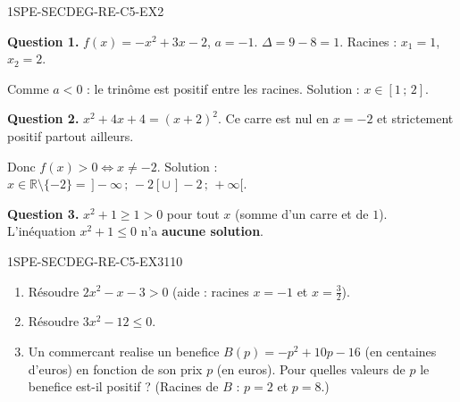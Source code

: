 \begin{corrige}{1SPE-SECDEG-RE-C5-EX2}

\textbf{Question 1.} $f(x) = -x^2 + 3x - 2$, $a = -1$. $\Delta = 9 - 8 = 1$. Racines : $x_1 = 1$, $x_2 = 2$.

Comme $a < 0$ : le trinôme est positif entre les racines. Solution : $x \in [1\,;\,2]$.


\textbf{Question 2.} $x^2 + 4x + 4 = (x+2)^2$. Ce carre est nul en $x = -2$ et strictement positif partout ailleurs.

Donc $f(x) > 0 \Leftrightarrow x
\neq -2$. Solution : $x \in \mathbb{R} \setminus \{-2\} = \,]-\infty\,;\,-2[ \cup \,]-2\,;\,+\infty[$.


\textbf{Question 3.} $x^2 + 1 \geq 1 > 0$ pour tout $x$ (somme d'un carre et de $1$). L'inéquation $x^2 + 1 \leq 0$ n'a \textbf{aucune solution}.

\end{corrige}


\begin{exercice}{1SPE-SECDEG-RE-C5-EX3}{1}{10}
\begin{enumerate}
  \item Résoudre $2x^2 - x - 3 > 0$ (aide : racines $x = -1$ et $x = \frac{3}{2}$).
  \item Résoudre $3x^2 - 12 \leq 0$.
  \item Un commercant realise un benefice $B(p) = -p^2 + 10p - 16$ (en centaines d'euros) en fonction de son prix $p$ (en euros). Pour quelles valeurs de $p$ le benefice est-il positif ? (Racines de $B$ : $p = 2$ et $p = 8$.)
\end{enumerate}
\end{exercice}


